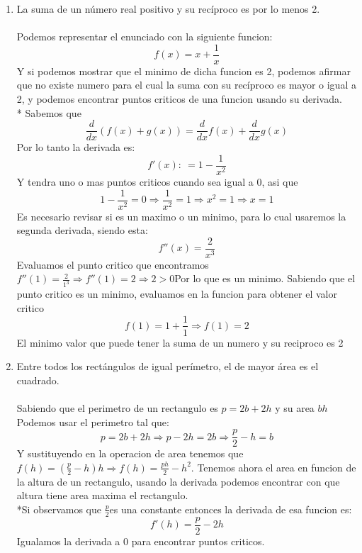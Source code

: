 \documentclass[12pt]{article}
\begin{document}
\begin{enumerate}[\hspace{9px} a)]
    \item La suma de un n\'umero real positivo y su rec\'iproco es por lo menos 2.\\ \\
      Podemos representar el enunciado con la siguiente funcion:
      \[f(x) = x+\displaystyle\frac{1}{x}\] 
      Y si podemos mostrar que el minimo de dicha funcion es 2, podemos afirmar que no existe numero para el cual la suma con su rec\'iproco es mayor o igual a 2, y podemos encontrar puntos criticos de una funcion usando su derivada.\\*
      Sabemos que \[\displaystyle\frac{d}{dx}(f(x)+g(x)) = \displaystyle\frac{d}{dx}f(x)+\displaystyle\frac{d}{dx}g(x)\]
      Por lo tanto la derivada es: 
      \[f'(x): \ = 1-\displaystyle\frac{1}{x^2}\]
      Y tendra uno o mas puntos criticos cuando sea igual a 0, asi que \[1-\displaystyle\frac{1}{x^2}=0\Rightarrow\displaystyle\frac{1}{x^2}=1\Rightarrow x^2 = 1 \Rightarrow x=1\]   
      Es necesario revisar si es un maximo o un minimo, para lo cual usaremos la segunda derivada, siendo esta: \[f''(x)=\displaystyle\frac{2}{x^3}\]
      Evaluamos el punto critico que encontramos \(f''(1)=\displaystyle\frac{2}{1^3}\Rightarrow f''(1)=2\Rightarrow 2>0\)\quad Por lo que es un minimo.
      Sabiendo que el punto critico es un minimo, evaluamos en la funcion para obtener el valor critico
      \[f(1)=1+\displaystyle\frac{1}{1}\Rightarrow f(1)=2\]
      El minimo valor que puede tener la suma de un numero y su reciproco es 2
    \item Entre todos los rect\'angulos de igual per\'imetro, el de mayor \'area es el cuadrado.\\ \\
    Sabiendo que el perimetro de un rectangulo es \(p=2b+2h\) y su area \(bh\)
    Podemos usar el perimetro tal que: \[p=2b+2h\Rightarrow p-2h=2b\Rightarrow \displaystyle\frac{p}{2}-h=b\]
    Y sustituyendo en la operacion de area tenemos que \(f(h)=(\displaystyle\frac{p}{2}-h)h\Rightarrow f(h)=\displaystyle\frac{ph}{2}-h^2\).
    Tenemos ahora el area en funcion de la altura de un rectangulo, usando la derivada podemos encontrar con que altura tiene area maxima el rectangulo. \\*Si observamos que \(\displaystyle\frac{p}{2}\)es una constante entonces la derivada de esa funcion es: 
    \[f'(h)=\displaystyle\frac{p}{2}-2h\]
    Igualamos la derivada a 0 para encontrar puntos criticos.

\end{enumerate}
\end{document}
